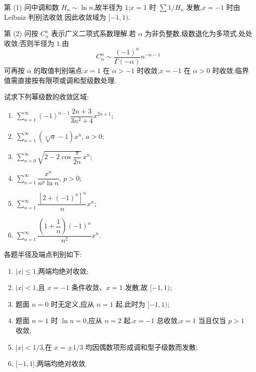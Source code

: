 \begin{solution}
    第 (1) 问中调和数 $H_n\sim\ln n$,故半径为 $1$;$x=1$ 时
    $\sum1/H_n$ 发散,$x=-1$ 时由 Leibniz 判别法收敛.因此收敛域为 $\lbrack-1,1)$.

    第 (2) 问按 $C_{\alpha}^{n}$ 表示广义二项式系数理解.若 $\alpha$ 为非负整数,级数退化为多项式,处处收敛;否则半径为 $1$.由
    \[
        C_{\alpha}^{n}\sim\dfrac{(-1)^n}{\Gamma(-\alpha)}n^{-\alpha-1}
    \]
    可再按 $\alpha$ 的取值判别端点:$x=1$ 在 $\alpha>-1$ 时收敛,$x=-1$ 在 $\alpha>0$ 时收敛;临界值需直接按有限项或调和型级数处理.
\end{solution}

\begin{example}
    试求下列幂级数的收敛区域:
    \begin{enumerate}
        \item $\displaystyle\sum\limits_{n=1}^{\infty}(-1)^{n-1}\dfrac{2n+3}{3n^2+4}x^{2n+1}$;
        \item $\displaystyle\sum\limits_{n=1}^{\infty}(\sqrt[n]{a}-1)x^n$, $a>0$;
        \item $\displaystyle\sum\limits_{n=0}^{\infty}\sqrt{2-2\cos\dfrac{\pi}{2n}}\,x^n$;
        \item $\displaystyle\sum\limits_{n=1}^{\infty}\dfrac{x^n}{n^p\ln n}$, $p>0$;
        \item $\displaystyle\sum\limits_{n=1}^{\infty}\dfrac{[2+(-1)^n]^n}{n}x^n$;
        \item $\displaystyle\sum\limits_{n=1}^{\infty}\dfrac{(1+\dfrac{1}{n})(-1)^n}{n^2}x^n$.
    \end{enumerate}
\end{example}
\exampleblank

\begin{solution}
    各题半径及端点判别如下:
    \begin{enumerate}
        \item $|x|\leq1$,两端均绝对收敛;
        \item $|x|<1$,且 $x=-1$ 条件收敛、$x=1$ 发散,故 $\lbrack-1,1)$;
        \item 题面 $n=0$ 时无定义,应从 $n=1$ 起.此时为 $\lbrack-1,1)$;
        \item 题面 $n=1$ 时 $\ln n=0$,应从 $n=2$ 起.$x=-1$ 总收敛,$x=1$ 当且仅当 $p>1$ 收敛;
        \item $|x|<1/3$,在 $x=\pm1/3$ 均因偶数项形成调和型子级数而发散;
        \item $\lbrack-1,1\rbrack$,两端均绝对收敛.
    \end{enumerate}
\end{solution}

